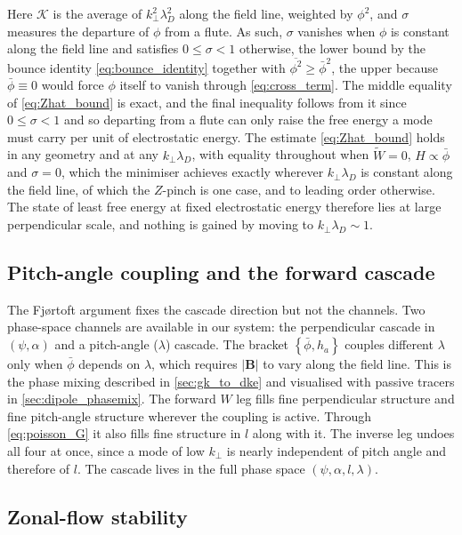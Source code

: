 \documentclass{jpp}
\newcommand{\bB}{\mathbf{B}}
\newcommand{\kperp}{k_\perp}
\newcommand{\pbra}[2]{\left\lbrace #1, #2 \right\rbrace}
\newcommand{\lambdaD}{\lambda_D}
\begin{document}
Here $\mathcal{K}$ is the average of $\kperp^2\lambdaD^2$ along the field line, weighted by $\phi^2$, and $\sigma$ measures the departure of $\phi$ from a flute. As such, $\sigma$ vanishes when $\phi$ is constant along the field line and satisfies $0 \leq \sigma < 1$ otherwise, the lower bound by the bounce identity \cref{eq:bounce_identity} together with $\overline{\phi^2} \geq \bar\phi^2$, the upper because $\bar\phi \equiv 0$ would force $\phi$ itself to vanish through \cref{eq:cross_term}. The middle equality of \cref{eq:Zhat_bound} is exact, and the final inequality follows from it since $0 \leq \sigma < 1$ and so departing from a flute can only raise the free energy a mode must carry per unit of electrostatic energy. The estimate \cref{eq:Zhat_bound} holds in any geometry and at any $\kperp\lambdaD$, with equality throughout when $\tilde W = 0$, $H \propto \bar\phi$ and $\sigma = 0$, which the minimiser achieves exactly wherever $\kperp\lambdaD$ is constant along the field line, of which the $Z$-pinch is one case, and to leading order otherwise. The state of least free energy at fixed electrostatic energy therefore lies at large perpendicular scale, and nothing is gained by moving to $\kperp\lambdaD \sim 1$.

\subsection{Pitch-angle coupling and the forward cascade}\label{sec:lambda_coupling}

The Fj\o rtoft argument fixes the cascade direction but not the channels. Two phase-space channels are available in our system: the perpendicular cascade in $(\psi,\alpha)$ and a pitch-angle ($\lambda$) cascade. The bracket $\pbra{\bar\phi}{h_a}$ couples different $\lambda$ only when $\bar\phi$ depends on $\lambda$, which requires $|\bB|$ to vary along the field line. This is the phase mixing described in \cref{sec:gk_to_dke} and visualised with passive tracers in \cref{sec:dipole_phasemix}. The forward $W$ leg fills fine perpendicular structure and fine pitch-angle structure wherever the coupling is active. Through \cref{eq:poisson_G} it also fills fine structure in $l$ along with it. The inverse leg undoes all four at once, since a mode of low $\kperp$ is nearly independent of pitch angle and therefore of $l$. The cascade lives in the full phase space $(\psi,\alpha,l,\lambda)$.

\subsection{Zonal-flow stability}\label{sec:zonal_stability}
\end{document}
